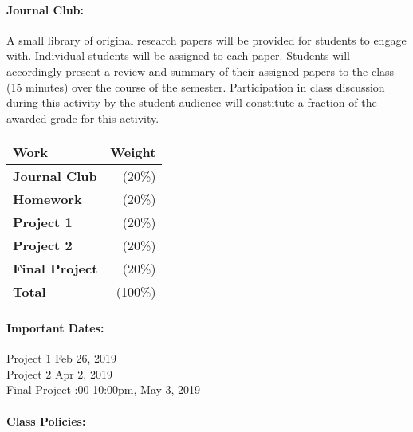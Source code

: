 \documentclass[11pt]{article}
\begin{document}
\paragraph{Journal Club:} A small library of original research papers will be 
provided for students to engage with. Individual students will be  assigned to 
each paper. Students will accordingly present a review and summary of their 
assigned papers to the class (15 minutes) over the course of the semester.  
Participation in class discussion during this activity by the student audience 
will constitute a fraction of the awarded grade for this activity.

\begin{table}[h]
\begin{tabularx}{\textwidth}{Xr}
        \textbf{Work} & \textbf{Weight} \\
\hline
\textbf{Journal Club}    & (20\%)  \\
\textbf{Homework}    & (20\%)  \\
\textbf{Project 1}    & (20\%)  \\
\textbf{Project 2}    & (20\%)  \\
\textbf{Final Project}  & (20\%)  \\
\hline
\textbf{Total}       & (100\%)\\
\end{tabularx}
\end{table}

\paragraph{Important Dates:}
\begin{center} \begin{minipage}{3.8in}
\begin{flushleft}
Project 1    \dotfill  Feb 26, 2019\\
Project 2  \dotfill  Apr 2, 2019\\
Final Project    :00-10:00pm, May 3, 2019\\
\end{flushleft}
\end{minipage}
\end{center}

\paragraph{Class Policies:}
\end{document}
